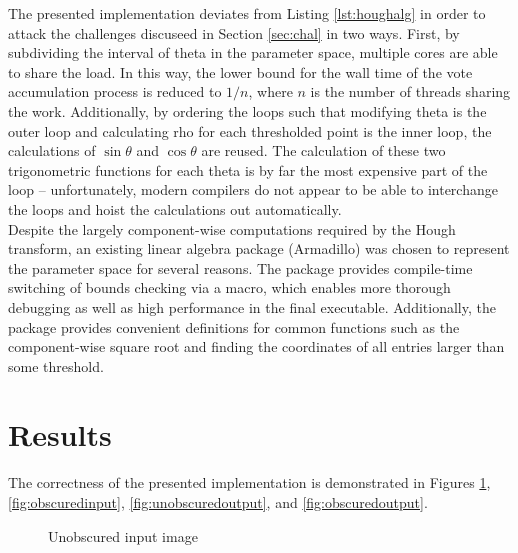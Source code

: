 \documentclass[letterpaper,12pt]{article}
\begin{document}
The presented implementation deviates from Listing \ref{lst:houghalg} in order to attack
the challenges discuseed in Section \ref{sec:chal} in two ways. First, by subdividing the
interval of theta in the parameter space, multiple cores are able to share the load. In this way,
the lower bound for the wall time of the vote accumulation process is reduced to $1/n$, where $n$
is the number of threads sharing the work. Additionally, by ordering the loops such that modifying
theta is the outer loop and calculating rho for each thresholded point is the inner loop, the
calculations of $\sin{\theta}$ and $\cos{\theta}$ are reused. The calculation of these two
trigonometric functions for each theta is by far the most expensive part of the loop\cite{agnerfog2014}
-- unfortunately, modern compilers do not appear to be able to interchange the loops and hoist the
calculations out automatically.
\\
Despite the largely component-wise computations required by the Hough transform, an existing
linear algebra package (Armadillo) was chosen to represent the parameter space for several
reasons. The package provides compile-time switching of bounds checking via a macro, which enables
more thorough debugging as well as high performance in the final executable. Additionally, the
package provides convenient definitions for common functions such as the component-wise square root
and finding the coordinates of all entries larger than some threshold.

\section{Results}
The correctness of the presented implementation is demonstrated in Figures \ref{fig:unobscuredinput},
\ref{fig:obscuredinput}, \ref{fig:unobscuredoutput}, and \ref{fig:obscuredoutput}.

\begin{figure}[H]
    \caption{Unobscured input image}
    \label{fig:unobscuredinput}
\end{figure}
\end{document}
